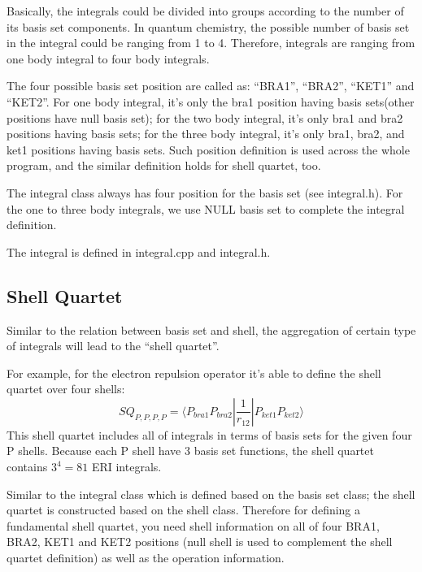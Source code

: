 Basically, the integrals could be divided into groups according 
to the number of its basis set components. In quantum chemistry, 
the possible number of basis set in the integral could be ranging 
from 1 to 4. Therefore, integrals are ranging from one body integral to 
four body integrals. 

The four possible basis set position are called as: ``BRA1'', ``BRA2'',
``KET1'' and ``KET2''. For one body integral, it's only the bra1
position having basis sets(other positions have null basis set); 
for the two body integral, it's only bra1 and bra2 positions having 
basis sets; for the three body integral, 
it's only bra1, bra2, and ket1 positions having basis sets. 
Such position definition is used across the whole program, and the 
similar definition holds for shell quartet, too.

The integral class always has four position for the basis set (see 
integral.h). For the one to three body integrals, we use NULL
basis set to complete the integral definition.

The integral is defined in integral.cpp and integral.h.
\subsection{Shell Quartet}
%
%
\label{shell_quartet}
Similar to the relation between basis set and shell, the aggregation 
of certain type of integrals will lead to the ``shell quartet''.

For example, for the electron repulsion operator it's able to define 
the shell quartet over four shells:
\begin{equation}
 SQ_{P,P,P,P} = \langle P_{bra1}P_{bra2}|
 \frac{1}{r_{12}}|P_{ket1}P_{ket2} \rangle
\end{equation}
This shell quartet includes all of integrals in terms of basis sets
for the given four P shells. Because each P shell have 3 basis set
functions, the shell quartet contains $3^{4} = 81$ ERI integrals.

Similar to the integral class which is defined based on the basis set
class; the shell quartet is constructed based on the shell class. Therefore
for defining a fundamental shell quartet, you need shell information
on all of four BRA1, BRA2, KET1 and KET2 positions (null shell is used
to complement the shell quartet definition) as well as the operation
information.

